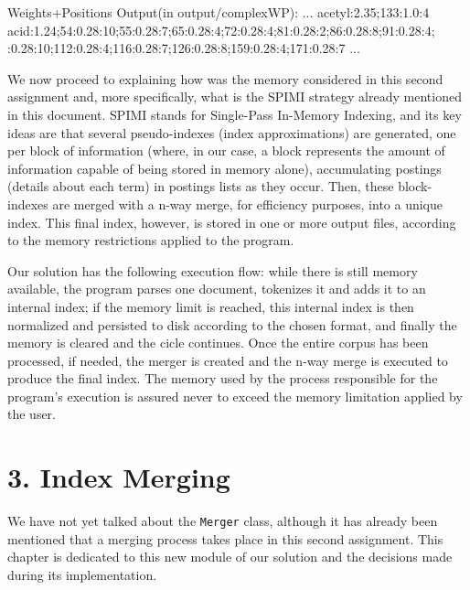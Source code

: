 \documentclass[12pt]{article}
\begin{document}
\newpage
Weights+Positions Output(in output/complexWP):
\newline ...
\newline acetyl:2.35;133:1.0:4
\newline acid:1.24;54:0.28:10;55:0.28:7;65:0.28:4;72:0.28:4;81:0.28:2;86:0.28:8;91:0.28:4;
:0.28:10;112:0.28:4;116:0.28:7;126:0.28:8;159:0.28:4;171:0.28:7
\newline ...
\newline

We now proceed to explaining how was the memory considered in this second 
assignment and, more specifically, what is the SPIMI strategy already 
mentioned in this document.
SPIMI stands for Single-Pass In-Memory Indexing, and its key ideas are 
that several pseudo-indexes (index approximations) are generated, one per 
block of information (where, in our case, a block represents the amount 
of information capable of being stored in memory alone), accumulating 
postings (details about each term) in postings lists as they occur. 
Then, these block-indexes are merged with a n-way merge, for efficiency 
purposes, into a unique index.
This final index, however, is stored in one or more output files, 
according to the memory restrictions applied to the program.

Our solution has the following execution flow: while there is still memory 
available, the program parses one document, tokenizes it and adds it to an
internal index; if the memory limit is reached, this internal index is then 
normalized and persisted to disk according to the chosen format, and finally 
the memory is cleared and the cicle continues.
Once the entire corpus has been processed, if needed, the merger is created 
and the n-way merge is executed to produce the final index. 
The memory used by the process responsible for the program's execution is 
assured never to exceed the memory limitation applied by the user.

\newpage
\section*{3. Index Merging}

We have not yet talked about the \texttt{Merger} class, although it has 
already been mentioned that a merging process takes place in this second 
assignment.
This chapter is dedicated to this new module of our solution and the 
decisions made during its implementation.
\end{document}
